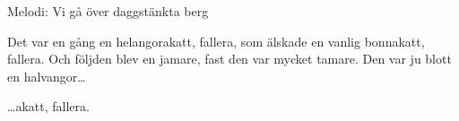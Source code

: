 \begin{song}

\begin{songmeta}
Melodi: Vi gå över daggstänkta berg
\end{songmeta}

\begin{songtext}
Det var en gång en helangorakatt, fallera,
som älskade en vanlig bonnakatt, fallera.
Och följden blev en jamare,
fast den var mycket tamare.
Den var ju blott en halvangor\ldots

\ldots{}akatt, fallera.
\end{songtext}

\end{song}

